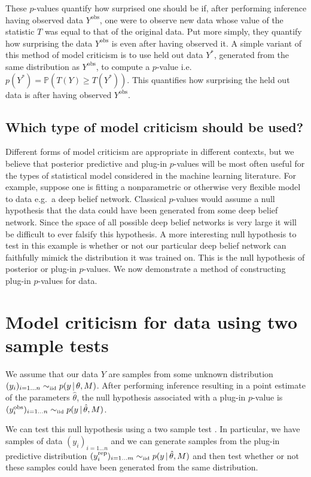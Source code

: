 \documentclass{article} %
\def\ie{i.e.\ }
\def\eg{e.g.\ }
\begin{document}
These $p$-values quantify how surprised one should be if, after performing inference having observed data $Y^\textrm{obs}$, one were to observe new data whose value of the statistic $T$ was equal to that of the original data.
Put more simply, they quantify how surprising the data $Y^\textrm{obs}$ is even after having observed it.
A simple variant of this method of model criticism is to use held out data $Y^*$, generated from the same distribution as $Y^\textrm{obs}$, to compute a $p$-value \ie ${p(Y^*) = \mathbb{P}(T(Y)\geq T(Y^*))}$.
This quantifies how surprising the held out data is after having observed $Y^\textrm{obs}$.

\subsection{Which type of model criticism should be used?}

Different forms of model criticism are appropriate in different contexts, but we believe that posterior predictive and plug-in $p$-values will be most often useful for the types of statistical model considered in the machine learning literature.
For example, suppose one is fitting a nonparametric or otherwise very flexible model to data \eg a deep belief network.
Classical $p$-values would assume a null hypothesis that the data could have been generated from some deep belief network.
Since the space of all possible deep belief networks is very large it will be difficult to ever falsify this hypothesis.
A more interesting null hypothesis to test in this example is whether or not our particular deep belief network can faithfully mimick the distribution it was trained on.
This is the null hypothesis of posterior or plug-in $p$-values.
We now demonstrate a method of constructing plug-in $p$-values for \iid data.

\section{Model criticism for \iid data using two sample tests}
\label{sec:model-crit-two-sample}

We assume that our data $Y$ are \iid samples from some unknown distribution ${(y_i)_{i=1\ldots n} \simiid p(y\given \theta, M)}$.
After performing inference resulting in a point estimate of the parameters $\hat\theta$, the null hypothesis associated with a plug-in $p$-value is ${(y^\textrm{obs}_i)_{i=1\ldots n} \simiid p(y \given \hat\theta, M)}$.

We can test this null hypothesis using a two sample test \citep[e.g.][]{Friedman1979-ur, Bickel1969-ao, Hotelling1951-jd}.
In particular, we have samples of data $(y_i)_{i=1\ldots n}$ and we can generate samples from the plug-in predictive distribution ${(y_i^\textrm{rep})_{i=1\ldots m} \simiid p(y \given \hat\theta, M)}$ and then test whether or not these samples could have been generated from the same distribution.
\end{document}
